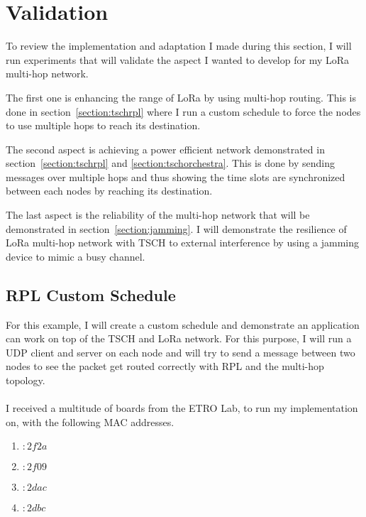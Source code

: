 \section{Validation\label{section:tschtesting}}

To review the implementation and adaptation I made during this section, I will
run experiments that will validate the aspect I wanted to develop for my
LoRa multi-hop network.

The first one is enhancing the range of LoRa by using multi-hop routing.
This is done in section~\ref{section:tschrpl} where I run a custom schedule
to force the nodes to use multiple hops to reach its destination.

The second aspect is achieving a power efficient network demonstrated in
section~\ref{section:tschrpl} and \ref{section:tschorchestra}.
This is done by sending messages over multiple hops and thus showing the time
slots are synchronized between each nodes by reaching its destination.

The last aspect is the reliability of the multi-hop network that will be
demonstrated in section~\ref{section:jamming}. I will demonstrate the resilience
of LoRa multi-hop network with TSCH to external interference by using a jamming
device to mimic a busy channel.

\subsection{RPL Custom Schedule\label{section:tschrpl}}

For this example, I will create a custom schedule and demonstrate an application
can work on top of the TSCH and LoRa network.
For this purpose, I will run a UDP client and server on each node and will try
to send a message between two nodes to see the packet get routed correctly with
RPL and the multi-hop topology.

\paragraph{}

I received a multitude of boards from the ETRO Lab, to run my
implementation on, with the following MAC addresses.

\begin{enumerate}
  \item $:2f2a$
  \item $:2f09$
  \item $:2dac$
  \item $:2dbc$
\end{enumerate}

